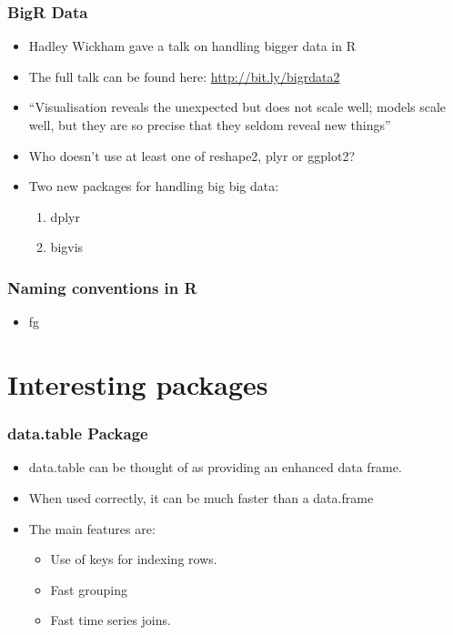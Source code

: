 \documentclass{beamer}
\begin{document}
\begin{frame}[label=current]
  \frametitle{BigR Data}
  \begin{itemize}
    \item Hadley Wickham gave a talk on handling bigger data in R
    \item The full talk can be found here: \url{http://bit.ly/bigrdata2}
    \item ``Visualisation reveals the unexpected but does not scale well; models
      scale well, but they are so precise that they seldom reveal new things''
    \item Who doesn't use at least one of reshape2, plyr or ggplot2?
    \item Two new packages for handling big big data:
      \begin{enumerate}
        \item dplyr
        \item bigvis
      \end{enumerate}
  \end{itemize}
\end{frame}

\begin{frame}
  \frametitle{Naming conventions in R}
  \begin{itemize}
    \item fg
  \end{itemize}
\end{frame}

\section{Interesting packages}
\begin{frame}[label=current]
  \frametitle{data.table Package}
  \begin{itemize}
    \item data.table can be thought of as providing an enhanced data frame.
    \item When used correctly, it can be much faster than a data.frame
    \item The main features are:
      \begin{itemize}
        \item Use of keys for indexing rows. 
        \item Fast grouping
        \item Fast time series joins.
      \end{itemize}
  \end{itemize}
\end{frame}
\end{document}
